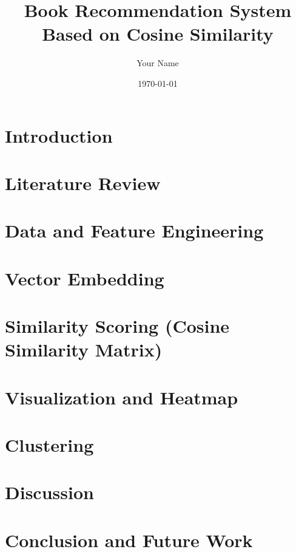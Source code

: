 \documentclass[12pt]{article}
\title{Book Recommendation System Based on Cosine Similarity}
\author{Your Name}
\date{\today}
\begin{document}
	
	\maketitle
	
	\begin{abstract}
		
	\end{abstract}
	
	\tableofcontents
	\newpage
	
	\section{Introduction}
	
	
	\section{Literature Review}
	
	
	\section{Data and Feature Engineering}
	
	
	\section{Vector Embedding}
	
	
	\section{Similarity Scoring (Cosine Similarity Matrix)}
	
	
		\section{Visualization and Heatmap}
	
	
	\section{Clustering} 
	
	
	\section{Discussion}
	
	
	\section{Conclusion and Future Work}
	
	
	
	
	
\end{document}

